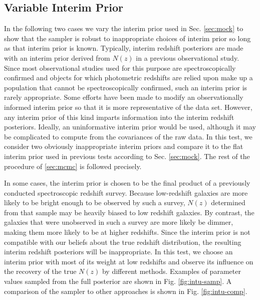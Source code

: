 \documentclass[preprint]{aastex}
\begin{document}
\clearpage
\subsection{Variable Interim Prior}
\label{sec:interim}

In the following two cases we vary the interim prior used in Sec. 
\ref{sec:mock} to show that the sampler is robust to inappropriate choices of 
interim prior so long as that interim prior is known.  Typically, interim 
redshift posteriors are made with an interim prior derived from $N(z)$ in a 
previous observational study.  Since most observational studies used for this 
purpose are spectroscopically confirmed and objects for which photometric 
redshifts are relied upon make up a population that cannot be spectroscopically 
confirmed, such an interim prior is rarely appropriate.  Some efforts have been 
made to modify an observationally informed interim prior so that it is more 
representative of the data set.  \citep{Sheldon2012}  However, any interim 
prior of this kind imparts information into the interim redshift posteriors.  
Ideally, an uninformative interim prior would be used, although it may be 
complicated to compute from the covariances of the raw data.  In this test, we 
consider two obviously inappropriate interim priors and compare it to the flat 
interim prior used in previous tests according to Sec. \ref{sec:mock}.  The 
rest of the procedure of \ref{sec:mcmc} is followed precisely.

In some cases, the interim prior is chosen to be the final product of a 
previously conducted spectroscopic redshift survey.  Because low-redshift 
galaxies are more likely to be bright enough to be observed by such a survey, 
$N(z)$ determined from that sample may be heavily biased to low redshift 
galaxies.  By contrast, the galaxies that were unobserved in such a survey are 
more likely be dimmer, making them more likely to be at higher redshifts.  
Since the interim prior is not compatible with our beliefs about the true 
redshift distribution, the resulting interim redshift posteriors will be 
inappropriate.  In this test, we choose an interim prior with most of its 
weight at low redshifts and observe its influence on the recovery of the true 
$N(z)$ by different methods.  Examples of parameter values sampled from the 
full posterior are shown in Fig. \ref{fig:intu-samp}.  A comparison of the 
sampler to other approaches is shown in Fig. \ref{fig:intu-comp}.
\end{document}

